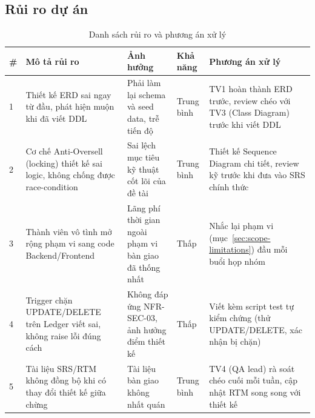 \subsection{Rủi ro dự án}
\begin{table}[htbp]
    \centering
    \small
    \caption{Danh sách rủi ro và phương án xử lý}
    \begin{tabular}{|p{0.5cm}|p{3.4cm}|p{3cm}|p{1.3cm}|p{3.4cm}|}
        \hline
        \textbf{\#} & \textbf{Mô tả rủi ro} & \textbf{Ảnh hưởng} & \textbf{Khả năng} & \textbf{Phương án xử lý} \\
        \hline
        1 & Thiết kế ERD sai ngay từ đầu, phát hiện muộn khi đã viết DDL & Phải làm lại schema và seed data, trễ tiến độ & Trung bình & TV1 hoàn thành ERD trước, review chéo với TV3 (Class Diagram) trước khi viết DDL \\
        \hline
        2 & Cơ chế Anti-Oversell (locking) thiết kế sai logic, không chống được race-condition & Sai lệch mục tiêu kỹ thuật cốt lõi của đề tài & Trung bình & Thiết kế Sequence Diagram chi tiết, review kỹ trước khi đưa vào SRS chính thức \\
        \hline
        3 & Thành viên vô tình mở rộng phạm vi sang code Backend/Frontend & Lãng phí thời gian ngoài phạm vi bàn giao đã thống nhất & Thấp & Nhắc lại phạm vi (mục~\ref{sec:scope-limitations}) đầu mỗi buổi họp nhóm \\
        \hline
        4 & Trigger chặn UPDATE/DELETE trên Ledger viết sai, không raise lỗi đúng cách & Không đáp ứng NFR-SEC-03, ảnh hưởng điểm thiết kế & Thấp & Viết kèm script test tự kiểm chứng (thử UPDATE/DELETE, xác nhận bị chặn) \\
        \hline
        5 & Tài liệu SRS/RTM không đồng bộ khi có thay đổi thiết kế giữa chừng & Tài liệu bàn giao không nhất quán & Trung bình & TV4 (QA lead) rà soát chéo cuối mỗi tuần, cập nhật RTM song song với thiết kế \\
        \hline
    \end{tabular}
\end{table}
